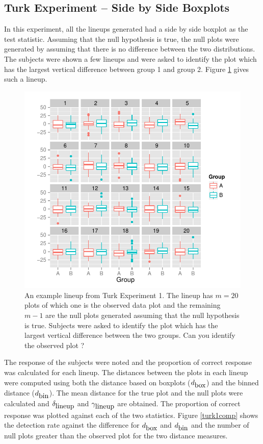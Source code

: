 \documentclass[12]{article}
\begin{document}
\subsection{Turk Experiment -- Side by Side Boxplots}

In this experiment, all the lineups generated had a side by side boxplot as the test statistic. Assuming that the null hypothesis is true, the null plots were generated by assuming that there is no difference between the two distributions. The subjects were shown a few lineups and were asked to identify the plot which has the largest vertical difference between group 1 and group 2. Figure \ref{turk1} gives such a lineup. \\

\begin{figure}[htbp]
\centering
\includegraphics[width=.5\textwidth]{turk1-example.pdf}
\caption{An example lineup from Turk Experiment 1. The lineup has $m = 20$ plots of which one is the observed data plot and the remaining $m - 1$ are the null plots generated assuming that the null hypothesis is true. Subjects were asked to identify the plot which has the largest vertical difference between the two groups. Can you identify the observed plot ?}
\label{turk1}
\end{figure}

The response of the subjects were noted and the proportion of correct response was calculated for each lineup. The distances between the plots in each lineup were computed using both the distance based on boxplots ($d_{\hbox{box}}$) and the binned distance ($d_{\hbox{bin}}$). The mean distance for the true plot and the null plots were calculated and $\delta_{\hbox{lineup}}$ and $\gamma_{\hbox{lineup}}$ are obtained. The proportion of correct response was plotted against each of the two statistics. Figure \ref{turk1comp} shows the detection rate against the difference for $d_{\hbox{box}}$ and $d_{\hbox{bin}}$ and the number of null plots greater than the observed plot for the two distance measures. 
\end{document}
